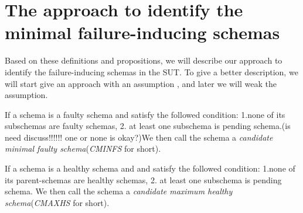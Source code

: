 \documentclass[10pt,journal,cspaper,compsoc]{IEEEtran}
\begin{document}
%
%
%





\section{The approach to identify the minimal failure-inducing schemas}\label{sec:app}
Based on these definitions and propositions, we will describe our approach to identify the failure-inducing schemas in the SUT. To give a better description, we will start give an approach with an assumption , and later we will weak the assumption.

\begin{definition}
If a schema is a faulty schema and satisfy the followed condition:
1.none of its subschemas are faulty schemas, 2. at least one subschema is pending schema.(is need discuss!!!!!! one or none is okay?)We then call the schema a \emph{candidate minimal faulty schema}(\emph{CMINFS} for short).
\end{definition}
\begin{definition}
If a schema is a healthy schema and and satisfy the followed condition:
1.none of its  parent-schemas are healthy schemas, 2. at least one subschema is pending schema. We then call the schema a \emph{candidate maximum healthy schema}(\emph{CMAXHS} for short).
\end{definition}
\end{document}
